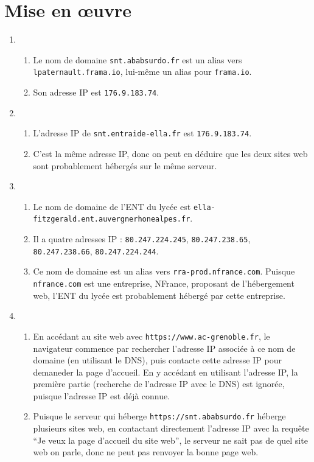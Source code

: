 \documentclass[12pt]{article}
\begin{document}
\section{Mise en œuvre}

\begin{enumerate}
  \item
\begin{enumerate}
  \item Le nom de domaine \texttt{snt.ababsurdo.fr} est un alias vers \texttt{lpaternault.frama.io}, lui-même un alias pour \texttt{frama.io}.
  \item Son adresse IP est \texttt{176.9.183.74}.
\end{enumerate}
\item 
  \begin{enumerate}
    \item L'adresse IP de \texttt{snt.entraide-ella.fr} est \texttt{176.9.183.74}.
    \item C'est la même adresse IP, donc on peut en déduire que les deux sites web sont probablement hébergés sur le même serveur.
  \end{enumerate}
\item 
  \begin{enumerate}
    \item Le nom de domaine de l'ENT du lycée est \texttt{ella-fitzgerald.ent.auvergnerhonealpes.fr}.
    \item Il a quatre adresses IP :
      \texttt{80.247.224.245},
      \texttt{80.247.238.65},
      \texttt{80.247.238.66},
      \texttt{80.247.224.244}.
    \item Ce nom de domaine est un alias vers \texttt{rra-prod.nfrance.com}. Puisque \texttt{nfrance.com} est une entreprise, NFrance, proposant de l'hébergement web, l'ENT du lycée est probablement hébergé par cette entreprise.
  \end{enumerate}
\item 
  \begin{enumerate}
    \item En accédant au site web avec \texttt{https://www.ac-grenoble.fr}, le navigateur commence par rechercher l'adresse IP associée à ce nom de domaine (en utilisant le DNS), puis contacte cette adresse IP pour demaneder la page d'accueil. En y accédant en utilisant l'adresse IP, la première partie (recherche de l'adresse IP avec le DNS) est ignorée, puisque l'adresse IP est déjà connue.
    \item Puisque le serveur qui héberge \texttt{https://snt.ababsurdo.fr} héberge plusieurs sites web, en contactant directement l'adresse IP avec la requête \enquote{Je veux la page d'accueil du site web}, le serveur ne sait pas de quel site web on parle, donc ne peut pas renvoyer la bonne page web.
  \end{enumerate}
\end{enumerate}
\end{document}
